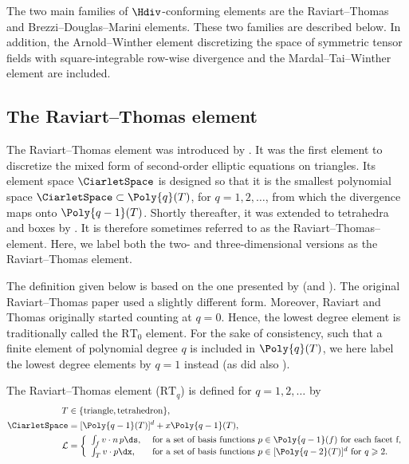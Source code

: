The two main families of $\Hdiv$-conforming elements are the
Raviart--Thomas and Brezzi--\break Douglas--Marini elements. These two
families are described below. In addition, the Arnold--Winther element
discretizing the space of symmetric tensor fields with
square-integrable row-wise divergence and the Mardal--Tai--Winther
element are included.


\vspace*{-6pt}\subsection{The Raviart--Thomas element}
\label{sec:raviartthomas}

The Raviart--Thomas element was introduced
by \citet{RaviartThomas1977}. It was the first element to discretize
the mixed form of second-order elliptic equations on triangles. Its
element space $\CiarletSpace$ is designed so that it is the smallest
polynomial space $\CiarletSpace \subset \Poly{q}(T)$, for $q = 1, 2,
\dots$, from which the divergence maps onto $\Poly{q-1}(T)$. Shortly
thereafter, it was extended to tetrahedra and boxes
by \citet{Nedelec1980}. It is therefore sometimes referred to as the
Raviart--Thomas--\nedelec{} element. Here, we label both the two- and
three-dimensional versions as the Raviart--Thomas element.

The definition given below is based on the one presented
by \citet{Nedelec1980} (and \citet{BrezziFortin1991}). The original
Raviart--Thomas paper used a slightly different form. Moreover,
Raviart and Thomas originally started counting at $q = 0$. Hence, the
lowest degree element is traditionally called the $\mathrm{RT}_0$
element.  For the sake of consistency, such that a finite element of
polynomial degree $q$ is included in $\Poly{q}(T)$, we here label the
lowest degree elements by $q = 1$ instead (as did also \nedelec{}).

\begin{definition}
  The Raviart--Thomas element ($\mathrm{RT}_q$) is
  defined for $q = 1, 2, \dots$ by
  \begin{align}
    T &\in \{ \mathrm{triangle}{}, \mathrm{tetrahedron}{}\}, \\
    \CiarletSpace &= [\Poly{q-1}(T)]^d  + x \Poly{q-1}(T), \\
    \mathcal{L} &=
    \left \{
    \begin{array}{ll}
      \int_{f} v \cdot n \, p \ds,
      & \text{ for a set of basis functions } p \in \Poly{q-1}(f)
      \text{ for each facet } $f$, \\
      \int_{T} v \cdot p \dx,
      & \text{ for a set of basis functions } p \in [\Poly{q-2}(T)]^d
      \text{ for } q \geqslant 2. \\
    \end{array}
    \right .
  \end{align}
\end{definition}

